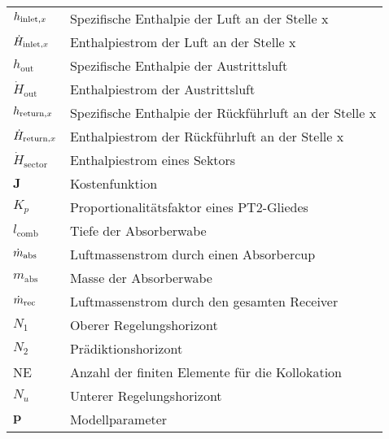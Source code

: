 \begin{longtable}{p{}p{}}
    $h_{\mathrm{inlet,}x}$     & Spezifische Enthalpie der Luft an der Stelle x                   \\
    $\dot{H}_{\mathrm{inlet,}x}$         & Enthalpiestrom der Luft an der Stelle x                          \\
    $h_{\mathrm{out}}$               & Spezifische Enthalpie der Austrittsluft                          \\
    $\dot{H}_{\mathrm{out}}$         & Enthalpiestrom der Austrittsluft                                 \\
    $h_{\mathrm{return,}x}$    & Spezifische Enthalpie der Rückführluft an der Stelle x           \\
    $\dot{H}_{\mathrm{return,}x}$        & Enthalpiestrom der Rückführluft an der Stelle x                  \\
    $\dot{H}_{\mathrm{sector}}$      & Enthalpiestrom eines Sektors                                     \\
    $\boldsymbol{J}$                 & Kostenfunktion                                                   \\
    $K_p$                            & Proportionalitätsfaktor eines PT2-Gliedes                        \\
    $l_{\mathrm{comb}}$              & Tiefe der Absorberwabe                                           \\
    $\dot{m}_{\mathrm{abs}}$               & Luftmassenstrom durch einen Absorbercup                          \\
    $m_{\mathrm{abs}}$               & Masse der Absorberwabe                                           \\
    $\dot{m}_{\mathrm{rec}}$                  & Luftmassenstrom durch den gesamten Receiver                      \\
    $N_1$                            & Oberer Regelungshorizont                                         \\
    $N_2$                            & Prädiktionshorizont                                              \\
    NE                               & Anzahl der finiten Elemente für die Kollokation                  \\
    $N_u$                            & Unterer Regelungshorizont                                        \\
    $\boldsymbol{p}$                 & Modellparameter                                                  \\

\end{longtable}
